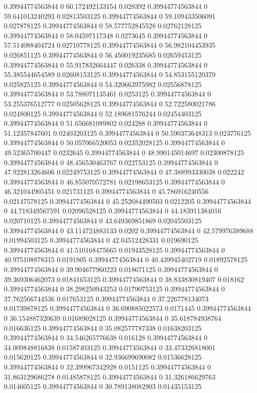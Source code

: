 0.39944774563844 0 60.172492133154 0.028392
0.39944774563844 0 59.641013240293 0.02813503125
0.39944774563844 0 59.109433506091 0.027878125
0.39944774563844 0 58.577752845528 0.02762128125
0.39944774563844 0 58.04597117348 0.0273645
0.39944774563844 0 57.514088404724 0.02710778125
0.39944774563844 0 56.982104453935 0.026851125
0.39944774563844 0 56.450019235685 0.02659453125
0.39944774563844 0 55.917832664447 0.026338
0.39944774563844 0 55.385544654589 0.02608153125
0.39944774563844 0 54.853155120379 0.025825125
0.39944774563844 0 54.320663975982 0.02556878125
0.39944774563844 0 53.788071135461 0.0253125
0.39944774563844 0 53.255376512777 0.02505628125
0.39944774563844 0 52.722580021786 0.024800125
0.39944774563844 0 52.189681576244 0.02454403125
0.39944774563844 0 51.656681089802 0.024288
0.39944774563844 0 51.12357847601 0.02403203125
0.39944774563844 0 50.590373648313 0.023776125
0.39944774563844 0 50.057066520053 0.02352028125
0.39944774563844 0 49.52365700447 0.0232645
0.39944774563844 0 48.990145014697 0.02300878125
0.39944774563844 0 48.456530463767 0.022753125
0.39944774563844 0 47.922813264606 0.02249753125
0.39944774563844 0 47.388993330038 0.022242
0.39944774563844 0 46.855070572781 0.02198653125
0.39944774563844 0 46.321044905451 0.021731125
0.39944774563844 0 45.786916240556 0.02147578125
0.39944774563844 0 45.252684490503 0.0212205
0.39944774563844 0 44.718349567591 0.02096528125
0.39944774563844 0 44.183911384016 0.020710125
0.39944774563844 0 43.649369851869 0.02045503125
0.39944774563844 0 43.114724883133 0.0202
0.39944774563844 0 42.579976389688 0.01994503125
0.39944774563844 0 42.04512428331 0.019690125
0.39944774563844 0 41.510168475665 0.01943528125
0.39944774563844 0 40.975108878315 0.0191805
0.39944774563844 0 40.439945402719 0.01892578125
0.39944774563844 0 39.904677960223 0.018671125
0.39944774563844 0 39.369306462073 0.01841653125
0.39944774563844 0 38.833830819407 0.018162
0.39944774563844 0 38.298250943253 0.01790753125
0.39944774563844 0 37.762566744536 0.017653125
0.39944774563844 0 37.226778134073 0.01739878125
0.39944774563844 0 36.690885022573 0.0171445
0.39944774563844 0 36.154887320639 0.01689028125
0.39944774563844 0 35.618784938764 0.016636125
0.39944774563844 0 35.082577787338 0.01638203125
0.39944774563844 0 34.546265776638 0.016128
0.39944774563844 0 34.009848816838 0.01587403125
0.39944774563844 0 33.473326818001 0.015620125
0.39944774563844 0 32.936699690082 0.01536628125
0.39944774563844 0 32.399967342928 0.0151125
0.39944774563844 0 31.863129686278 0.01485878125
0.39944774563844 0 31.326186629763 0.014605125
0.39944774563844 0 30.789138082903 0.01435153125
